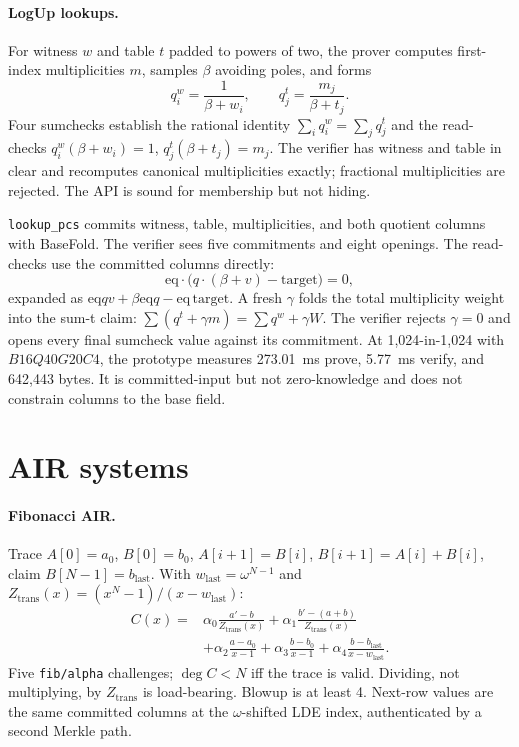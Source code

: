 \documentclass[11pt,a4paper]{article}
\newcommand{\wEq}{\mathrm{eq}}
\begin{document}
\paragraph{LogUp lookups.} For witness $w$ and table $t$ padded to powers of
two, the prover computes first-index multiplicities $m$, samples $\beta$
avoiding poles, and forms
\[
q^w_i=\frac{1}{\beta+w_i},\qquad
q^t_j=\frac{m_j}{\beta+t_j}.
\]
Four sumchecks establish the rational identity
$\sum_iq^w_i=\sum_jq^t_j$ and the read-checks
$q^w_i(\beta+w_i)=1$, $q^t_j(\beta+t_j)=m_j$. The verifier has witness and
table in clear and recomputes canonical multiplicities exactly; fractional
multiplicities are rejected. The API is sound for membership but not hiding.

\texttt{lookup\_pcs} commits witness, table, multiplicities, and both quotient
columns with BaseFold. The verifier sees five commitments and eight openings.
The read-checks use the committed columns directly:
\[
\wEq\cdot\bigl(q\cdot(\beta+v)-\mathrm{target}\bigr)=0,
\]
expanded as $\wEq qv+\beta\wEq q-\wEq\,\mathrm{target}$. A fresh $\gamma$
folds the total multiplicity weight into the sum-t claim:
$\sum(q^t+\gamma m)=\sum q^w+\gamma W$. The verifier rejects $\gamma=0$ and
opens every final sumcheck value against its commitment. At
1,024-in-1,024 with $B16Q40G20C4$, the prototype measures 273.01~ms prove,
5.77~ms verify, and 642,443 bytes. It is committed-input but not
zero-knowledge and does not constrain columns to the base field.

\section{AIR systems}

\paragraph{Fibonacci AIR.} Trace $A[0]=a_0$, $B[0]=b_0$, $A[i+1]=B[i]$,
$B[i+1]=A[i]+B[i]$, claim $B[N-1]=b_{\mathrm{last}}$. With
$w_{\mathrm{last}}=\omega^{N-1}$ and
$Z_{\mathrm{trans}}(x)=(x^N-1)/(x-w_{\mathrm{last}})$:
\[
\begin{aligned}
C(x)={}&\alpha_0\frac{a'-b}{Z_{\mathrm{trans}}(x)}
+\alpha_1\frac{b'-(a+b)}{Z_{\mathrm{trans}}(x)}\\
&+\alpha_2\frac{a-a_0}{x-1}
+\alpha_3\frac{b-b_0}{x-1}
+\alpha_4\frac{b-b_{\mathrm{last}}}{x-w_{\mathrm{last}}}.
\end{aligned}
\]
Five \texttt{fib/alpha} challenges; $\deg C<N$ iff the trace is valid.
Dividing, not multiplying, by $Z_{\mathrm{trans}}$ is load-bearing. Blowup is
at least 4. Next-row values are the same committed columns at the
$\omega$-shifted LDE index, authenticated by a second Merkle path.
\end{document}
